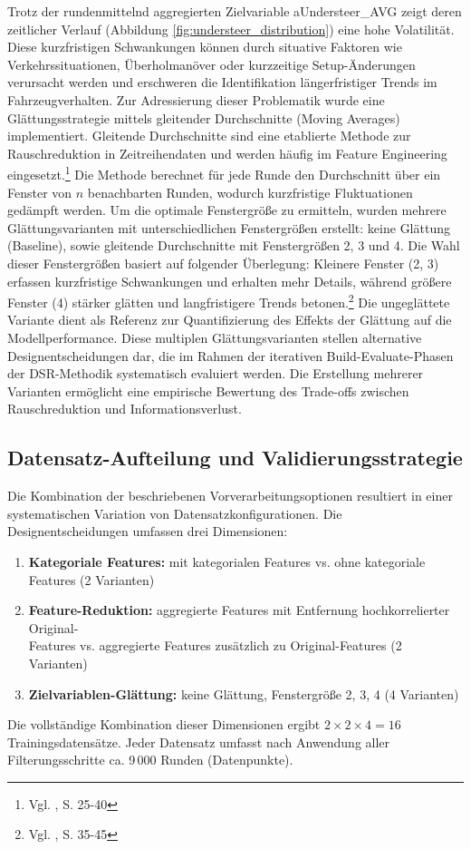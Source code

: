 Trotz der rundenmittelnd aggregierten Zielvariable aUndersteer\_AVG zeigt deren zeitlicher Verlauf (Abbildung \ref{fig:understeer_distribution}) eine hohe Volatilität. Diese kurzfristigen Schwankungen können durch situative Faktoren wie Verkehrssituationen, Überholmanöver oder kurzzeitige Setup-Änderungen verursacht werden und erschweren die Identifikation längerfristiger Trends im Fahrzeugverhalten.
Zur Adressierung dieser Problematik wurde eine Glättungsstrategie mittels gleitender Durchschnitte (Moving Averages) implementiert. Gleitende Durchschnitte sind eine etablierte Methode zur Rauschreduktion in Zeitreihendaten und werden häufig im Feature Engineering eingesetzt.\footnote{Vgl. \cite{Box2015}, S. 25-40} Die Methode berechnet für jede Runde den Durchschnitt über ein Fenster von $n$ benachbarten Runden, wodurch kurzfristige Fluktuationen gedämpft werden.
Um die optimale Fenstergröße zu ermitteln, wurden mehrere Glättungsvarianten mit unterschiedlichen Fenstergrößen erstellt: keine Glättung (Baseline), sowie gleitende Durchschnitte mit Fenstergrößen 2, 3 und 4.
Die Wahl dieser Fenstergrößen basiert auf folgender Überlegung: Kleinere Fenster (2, 3) erfassen kurzfristige Schwankungen und erhalten mehr Details, während größere Fenster (4) stärker glätten und langfristigere Trends betonen.\footnote{Vgl. \cite{Box2015}, S. 35-45} Die ungeglättete Variante dient als Referenz zur Quantifizierung des Effekts der Glättung auf die Modellperformance.
Diese multiplen Glättungsvarianten stellen alternative Designentscheidungen dar, die im Rahmen der iterativen Build-Evaluate-Phasen der \ac{DSR}-Methodik systematisch evaluiert werden. Die Erstellung mehrerer Varianten ermöglicht eine empirische Bewertung des Trade-offs zwischen Rauschreduktion und Informationsverlust.


\subsection{Datensatz-Aufteilung und Validierungsstrategie}

Die Kombination der beschriebenen Vorverarbeitungsoptionen resultiert in einer systematischen Variation von Datensatzkonfigurationen. Die Designentscheidungen umfassen drei Dimensionen:

\begin{enumerate}
  \item \textbf{Kategoriale Features:} mit kategorialen Features vs. ohne kategoriale Features (2 Varianten)
  \item \textbf{Feature-Reduktion:} aggregierte Features mit Entfernung hochkorrelierter Original-\\Features vs. aggregierte Features zusätzlich zu Original-Features (2 Varianten)
  \item \textbf{Zielvariablen-Glättung:} keine Glättung, Fenstergröße 2, 3, 4 (4 Varianten)
\end{enumerate}
Die vollständige Kombination dieser Dimensionen ergibt $2 \times 2 \times 4 = 16$ Trainingsdatensätze. Jeder Datensatz umfasst nach Anwendung aller Filterungsschritte ca. 9\,000 Runden (Datenpunkte).

